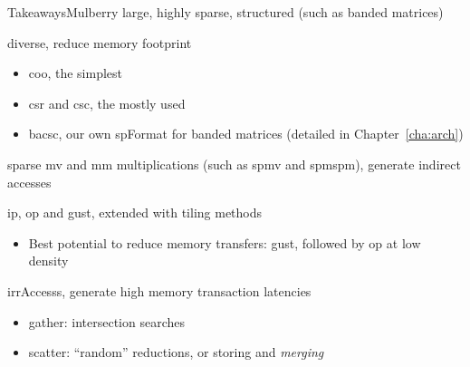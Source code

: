 \begin{highlight}{Takeaways}{Mulberry}
     large, highly sparse, structured (such as \gls{banded} matrices)

    \bigskip
     diverse, reduce memory footprint
    \begin{itemize}
        \item \acrshort{coo}, the simplest
        \item \acrshort{csr} and \acrshort{csc}, the mostly used
        \item \acrshort{bacsc}, our own \gls{spFormat} for \gls{banded} matrices (detailed in Chapter~\ref{cha:arch})
    \end{itemize}

    \bigskip
     sparse \acrshort{mv} and \acrshort{mm} multiplications (such as \acrshort{spmv} and \acrshort{spmspm}), generate indirect accesses

    \bigskip
     \acrfull{ip}, \acrfull{op} and \acrfull{gust}, extended with \gls{tiling} methods
    \begin{itemize}
        \item Best potential to reduce memory transfers: \acrshort{gust}, followed by \acrshort{op} at low density
    \end{itemize}

    \bigskip
     \glspl{irrAccess}, generate high memory transaction latencies

    \bigskip
    \begin{itemize}
        \item \gls{gather}: \gls{intersection} searches
        \item \gls{scatter}: ``random'' \glspl{reduction}, or storing and \emph{merging} 
    \end{itemize}
\end{highlight}